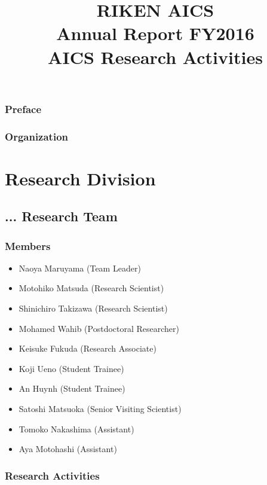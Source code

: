 \documentclass{book}
\title{RIKEN AICS\\
       Annual Report FY2016\\
      AICS Research Activities}
\author{}
\begin{document}
\maketitle

\section*{Preface}

\newpage

\section*{Organization}


\tableofcontents

\part{Research Division}

\chapter{... Research Team}

\section{Members}

\begin{itemize}
  \item[] Naoya Maruyama (Team Leader)
  \item[] Motohiko Matsuda (Research Scientist)
  \item[] Shinichiro Takizawa (Research Scientist)
  \item[] Mohamed Wahib (Postdoctoral Researcher)
  \item[] Keisuke Fukuda (Research Associate)
  \item[] Koji Ueno (Student Trainee)
  \item[] An Huynh (Student Trainee)
  \item[] Satoshi Matsuoka (Senior Visiting Scientist)
  \item[] Tomoko Nakashima (Assistant)
  \item[] Aya Motohashi (Assistant)
\end{itemize}


\section{Research Activities}
\end{document}

